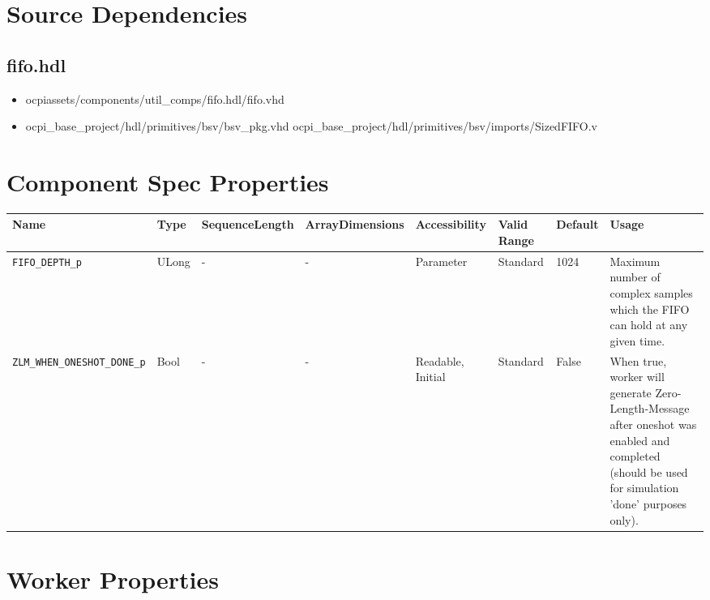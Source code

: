 \documentclass{article}
\def\comp{fifo}
\begin{document}
\section*{Source Dependencies}
\subsection*{\comp.hdl}
\begin{itemize}
  \item ocpiassets/components/util\_comps/fifo.hdl/fifo.vhd
  \item ocpi\_base\_project/hdl/primitives/bsv/bsv\_pkg.vhd
        \subitem ocpi\_base\_project/hdl/primitives/bsv/imports/SizedFIFO.v
\end{itemize}

\begin{landscape}
  \section*{Component Spec Properties}
  \begin{scriptsize}
    \begin{tabular}{|p{4cm}|p{1cm}|p{2cm}|p{2cm}|p{2cm}|p{2cm}|p{1cm}|p{5.5cm}|}
      \hline
      \rowcolor{blue}
      Name               & Type   & SequenceLength & ArrayDimensions   & Accessibility       & Valid Range                                                                      & Default & Usage                                                                        \\
      \hline
      \verb+FIFO_DEPTH_p+  & ULong  & -              & -                 & Parameter & Standard                                                                              & 1024      & Maximum number of complex samples which the FIFO can hold at any given time. \\
      \hline
      \verb+ZLM_WHEN_ONESHOT_DONE_p+        & Bool  & -              & -                 & Readable, Initial            & Standard                                                                         & False       & When true, worker will generate Zero-Length-Message after oneshot was enabled and completed (should be used for simulation 'done' purposes only).                     \\
      \hline
    \end{tabular}
  \end{scriptsize}

  \section*{Worker Properties}

\end{landscape}
\end{document}
